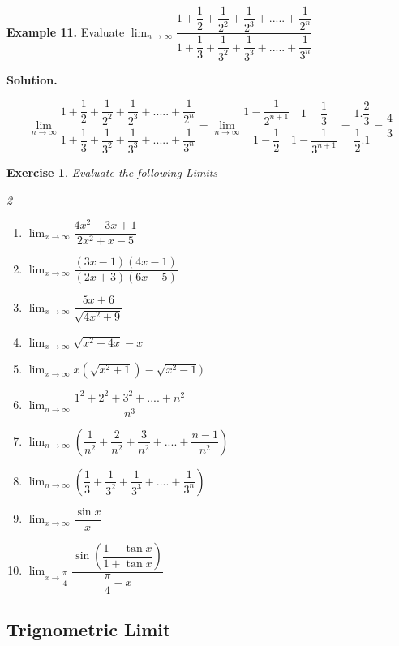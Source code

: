 \documentclass[../../main.tex]{subfiles}
\newtheorem{exercise}{Exercise}[section]
\begin{document}
\vspace{0.2cm}
\textbf{Example 11.}
\vspace{0.2cm}
Evaluate  $\lim_{n \rightarrow \infty}\dfrac{1+\dfrac{1}{2}+\dfrac{1}{2^2}+\dfrac{1}{2^3}+.....+\dfrac{1}{2^n}}{1+\dfrac{1}{3}+\dfrac{1}{3^2}+\dfrac{1}{3^3}+.....+\dfrac{1}{3^n}}$

\textbf{Solution.} 

\begin{equation*}
 \lim_{n \rightarrow \infty}\frac{1+\dfrac{1}{2}+\dfrac{1}{2^2}+\dfrac{1}{2^3}+.....+\dfrac{1}{2^n}}{1+\dfrac{1}{3}+\dfrac{1}{3^2}+\dfrac{1}{3^3}+.....+\dfrac{1}{3^n}} = \lim_{n\to\infty}\frac{1-\dfrac{1}{2^{n+1}}}{1-\dfrac{1}{2}}\frac{1-\dfrac{1}{3}}{1-\dfrac{1}{3^{n+1}}} = \frac{1.\dfrac{2}{3}}{\dfrac{1}{2}.1} = \frac{4}{3}
\end{equation*}
\newpage
\begin{exercise}
Evaluate the following Limits
\begin{multicols}{2}
\begin{enumerate}
    \item $\lim_{x \rightarrow \infty}\dfrac{4x^2-3x+1}{2x^2+x-5}$
    \item $\lim_{x \rightarrow \infty}\dfrac{(3x-1)(4x-1)}{(2x+3)(6x-5)}$
    \item $\lim_{x \rightarrow \infty}\dfrac{5x+6}{\sqrt{4x^2+9}}$
    \item $\lim_{x \rightarrow \infty}\sqrt{x^2+4x}-x$
    \item $\lim_{x \rightarrow \infty}{x(\sqrt{x^2+1})-\sqrt{x^2-1})}$
    \item $\lim_{n \rightarrow \infty}\dfrac{1^2+2^2+3^2+....+n^2}{n^3}$
    \item $\lim_{n \rightarrow \infty}(\dfrac{1}{n^2}+\dfrac{2}{n^2}+\dfrac{3}{n^2}+....+\dfrac{n-1}{n^2})$
    \item $\lim_{n \rightarrow \infty}(\dfrac{1}{3}+\dfrac{1}{3^2}+\dfrac{1}{3^3}+....+\dfrac{1}{3^n})$
    \item $\lim_{x \rightarrow \infty}\dfrac{\sin{x}}{x}$
    \item $\lim_{x \rightarrow \dfrac{\pi}{4}}\dfrac{\sin (\dfrac{1-\tan x}{1+\tan x})}{\dfrac{\pi}{4}-x}$
\end{enumerate}
\end{multicols}
\end{exercise}

\subsection{Trignometric Limit}
\end{document}
